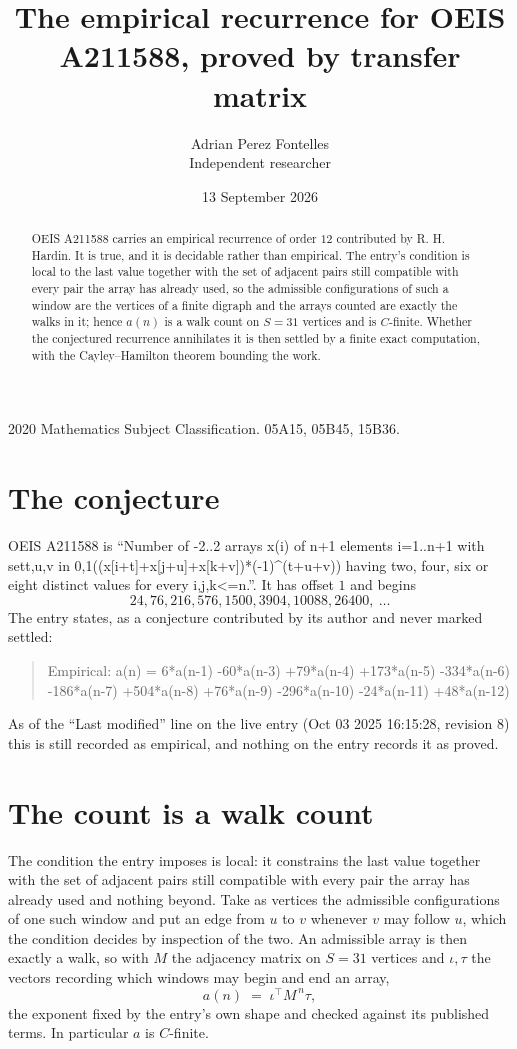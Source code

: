 \documentclass[11pt,a4paper]{article}
\title{The empirical recurrence for OEIS A211588, proved by transfer matrix}
\author{Adrian Perez Fontelles\\ \small Independent researcher}
\date{13 September 2026}
\theoremstyle{plain}
\theoremstyle{definition}
\begin{document}
\maketitle

\begin{abstract}
OEIS A211588 carries an empirical recurrence of order $12$ contributed by R. H. Hardin. It is
true, and it is decidable rather than empirical. The entry's condition is local to the last value together with the set of adjacent pairs still compatible with every pair the array has already used, so
the admissible configurations of such a window are the vertices of a finite digraph and the
arrays counted are exactly the walks in it; hence $a(n)$ is a walk count on $S=31$ vertices
and is $C$-finite. Whether the conjectured recurrence annihilates it is then settled by a
finite exact computation, with the Cayley--Hamilton theorem bounding the work.
\end{abstract}

\noindent\small 2020 Mathematics Subject Classification. 05A15, 05B45, 15B36.\normalsize

\section{The conjecture}

OEIS A211588 is ``Number of -2..2 arrays x(i) of n+1 elements i=1..n+1 with set{t,u,v in 0,1}((x[i+t]+x[j+u]+x[k+v])*(-1)\^{}(t+u+v)) having two, four, six or eight distinct values for every i,j,k<=n.''. It has offset $1$ and begins
\[
24, 76, 216, 576, 1500, 3904, 10088, 26400,\ \dots
\]
The entry states, as a conjecture contributed by its author and never marked settled:
\begin{quote}
Empirical: a(n) = 6*a(n-1) -60*a(n-3) +79*a(n-4) +173*a(n-5) -334*a(n-6) -186*a(n-7) +504*a(n-8) +76*a(n-9) -296*a(n-10) -24*a(n-11) +48*a(n-12)
\end{quote}
As of the ``Last modified'' line on the live entry (Oct 03 2025 16:15:28, revision 8) this is still
recorded as empirical, and nothing on the entry records it as proved.

\section{The count is a walk count}

The condition the entry imposes is local: it constrains the last value together with the set of adjacent pairs still compatible with every pair the array has already used and nothing beyond. Take as
vertices the admissible configurations of one such window and put an edge from $u$ to $v$
whenever $v$ may follow $u$, which the condition decides by inspection of the two. An
admissible array is then exactly a walk, so with $M$ the adjacency matrix on $S=31$ vertices
and $\iota,\tau$ the vectors recording which windows may begin and end an array,
\[
a(n)\;=\;\iota^{\!\top}M^{\,n}\tau ,
\]
the exponent fixed by the entry's own shape and checked against its published terms. In
particular $a$ is $C$-finite.
\end{document}

